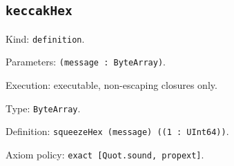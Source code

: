 \documentclass[11pt]{article}
\begin{document}
\subsection*{\texttt{keccakHex}}
\noindent Kind: \texttt{definition}.\par
\noindent Parameters: \texttt{(message : ByteArray)}.\par
\noindent Execution: executable, non-escaping closures only.\par
\noindent Type: \texttt{ByteArray}.\par
\noindent Definition: \texttt{squeezeHex (message) ((1 : UInt64))}.\par
\noindent Axiom policy: \texttt{exact [Quot.sound, propext]}.\par
\end{document}
